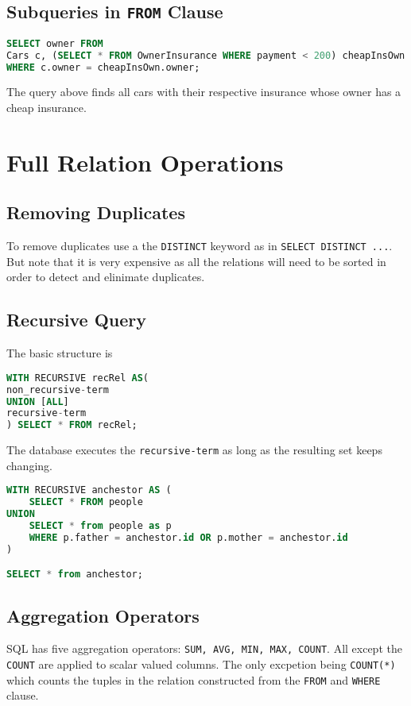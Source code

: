 \documentclass{article}
\renewcommand{\t}[1]{\texttt{#1}}
\begin{document}
\subsection*{Subqueries in \t{FROM} Clause}

\begin{lstlisting}[language=SQL]
SELECT owner FROM
Cars c, (SELECT * FROM OwnerInsurance WHERE payment < 200) cheapInsOwn
WHERE c.owner = cheapInsOwn.owner;
\end{lstlisting}
The query above finds all cars with their respective insurance whose owner has a cheap insurance.

\section*{Full Relation Operations}

\subsection*{Removing Duplicates}

To remove duplicates use a the  \t{DISTINCT} keyword as in \t{SELECT DISTINCT ...}. But note that it is very expensive as all the relations will need to be sorted in order to detect and elinimate duplicates. 


\subsection*{Recursive Query}
The basic structure is 
\begin{lstlisting}[language=SQL]
WITH RECURSIVE recRel AS(
non_recursive-term
UNION [ALL]
recursive-term
) SELECT * FROM recRel;
\end{lstlisting}
The database executes the \t{recursive-term} as long as the resulting set keeps changing.
\begin{lstlisting}[language=SQL]
WITH RECURSIVE anchestor AS (
	SELECT * FROM people
UNION
	SELECT * from people as p
	WHERE p.father = anchestor.id OR p.mother = anchestor.id
)

SELECT * from anchestor;
\end{lstlisting}

\subsection*{Aggregation Operators}

SQL has five aggregation operators: \texttt{SUM, AVG, MIN, MAX, COUNT}. All except the \t{COUNT} are applied to scalar valued columns. The only excpetion being \t{COUNT(*)} which counts the tuples in the relation constructed from the \t{FROM} and \t{WHERE} clause.
\end{document}
